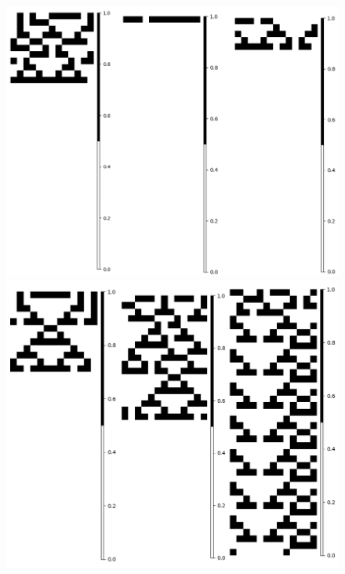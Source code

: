 \documentclass[11pt]{article}
\begin{document}
			\begin{figure}[H]
			\centering
			\includegraphics[scale=0.3]{resources/Atractores22/atractor_22_size_13_res.png}
			\includegraphics[scale=0.3]{resources/Atractores22/atractor_22_size_13_res1.png}

\end{figure}
\end{document}
